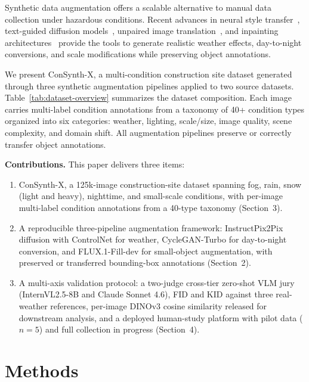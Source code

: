 \documentclass[12pt]{article}
\begin{document}
Synthetic data augmentation offers a scalable alternative to manual data collection under hazardous conditions. Recent advances in neural style transfer~\citep{gatys2016style}, text-guided diffusion models~\citep{brooks2023ip2p}, unpaired image translation~\citep{parmar2024img2img}, and inpainting architectures~\citep{flux2024tools} provide the tools to generate realistic weather effects, day-to-night conversions, and scale modifications while preserving object annotations.

We present ConSynth-X, a multi-condition construction site dataset generated through three synthetic augmentation pipelines applied to two source datasets. Table~\ref{tab:dataset-overview} summarizes the dataset composition. Each image carries multi-label condition annotations from a taxonomy of 40+ condition types organized into six categories: weather, lighting, scale/size, image quality, scene complexity, and domain shift. All augmentation pipelines preserve or correctly transfer object annotations.

\textbf{Contributions.} This paper delivers three items:
\begin{enumerate}[noitemsep]
    \item ConSynth-X, a 125k-image construction-site dataset spanning fog, rain, snow (light and heavy), nighttime, and small-scale conditions, with per-image multi-label condition annotations from a 40-type taxonomy (Section~3).
    \item A reproducible three-pipeline augmentation framework: InstructPix2Pix diffusion with ControlNet for weather, CycleGAN-Turbo for day-to-night conversion, and FLUX.1-Fill-dev for small-object augmentation, with preserved or transferred bounding-box annotations (Section~2).
    \item A multi-axis validation protocol: a two-judge cross-tier zero-shot VLM jury (InternVL2.5-8B and Claude Sonnet 4.6), FID and KID against three real-weather references, per-image DINOv3 cosine similarity released for downstream analysis, and a deployed human-study platform with pilot data ($n{=}5$) and full collection in progress (Section~4).
\end{enumerate}


\section{Methods}
\end{document}
